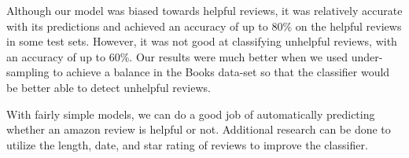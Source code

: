 \documentclass[11pt]{article}
\begin{document}
Although our model was biased towards helpful reviews, it was relatively accurate with its predictions and achieved an accuracy of up to 80\% on the helpful reviews in some test sets. However, it was not good at classifying unhelpful reviews, with an accuracy of up to 60\%. Our results were much better when we used under-sampling to achieve a balance in the Books data-set so that the classifier would be better able to detect unhelpful reviews. 

With fairly simple models, we can do a good job of automatically predicting whether an amazon review is helpful or not. Additional research can be done to utilize the length, date, and star rating of reviews to improve the classifier. 
\end{document}
